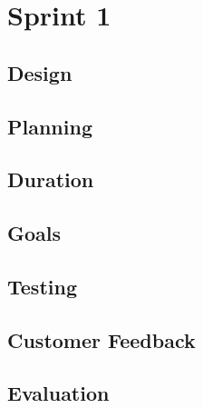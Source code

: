 \chapter{Sprint 1}
\section{Design}
\section{Planning}
\section{Duration}
\section{Goals}
\section{Testing}
\section{Customer Feedback}
\section{Evaluation}